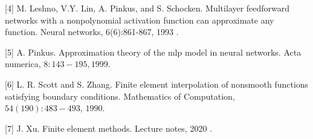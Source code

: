 \documentclass[10pt]{article}
\begin{document}
[4] M. Leshno, V.Y. Lin, A. Pinkus, and S. Schocken. Multilayer feedforward networks with a nonpolynomial activation function can approximate any function. Neural networks, 6(6):861-867, 1993 .

[5] A. Pinkus. Approximation theory of the mlp model in neural networks. Acta numerica, $8: 143-195,1999 .$

[6] L. R. Scott and S. Zhang. Finite element interpolation of nonsmooth functions satisfying boundary conditions. Mathematics of Computation, $54(190): 483-493$, $1990 .$

[7] J. Xu. Finite element methods. Lecture notes, 2020 .
\end{document}
